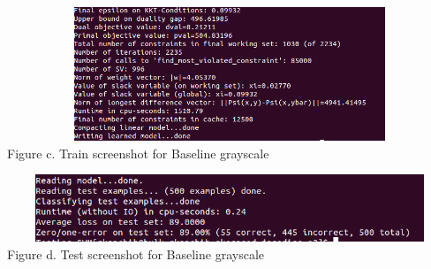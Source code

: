 \documentclass{article}
\begin{document}
\begin{enumerate}
		\begin{center}
			\includegraphics[width=14cm, height=4cm]{train_baseline_b.png} \\
			Figure c. Train screenshot for Baseline grayscale
		\end{center}
		
		\begin{center}
			\includegraphics[width=14cm, height=2cm]{test_baseline_b.png} \\
			Figure d. Test screenshot for Baseline grayscale
		\end{center}
		
	\end{enumerate}
	
\end{document}
